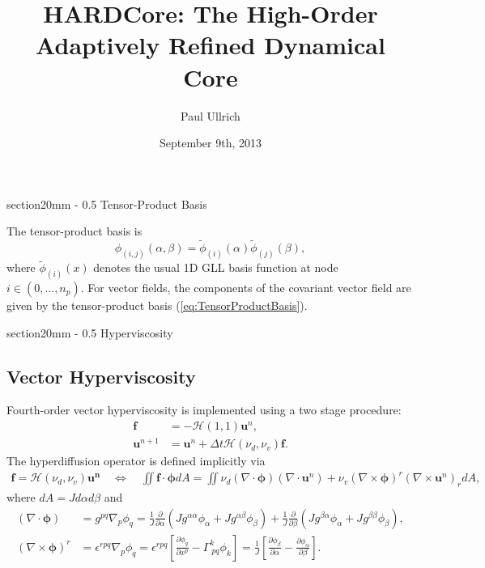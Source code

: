 \documentclass{article}
\title{\Huge \textbf{HARDCore: The High-Order Adaptively Refined Dynamical Core}}
\author{\Large Paul Ullrich}
\date{September 9th, 2013}
\makeatletter
\renewcommand\section{\@startsection
  {section}{2}{0mm}%
  {-\baselineskip}%
  {0.5\baselineskip}%
  {\normalfont\Huge\bfseries}}%
\newcommand{\vb}{\mathbf}
\newcommand{\vg}{\boldsymbol}
\newcommand{\pdiff}[2]{\frac{\partial #1}{\partial #2}}
\makeatother
\begin{document}
\section{Tensor-Product Basis}

The tensor-product basis is
\begin{equation} \label{eq:TensorProductBasis}
\phi_{(i,j)}(\alpha, \beta) = \tilde{\phi}_{(i)}(\alpha) \tilde{\phi}_{(j)}(\beta),
\end{equation} where $\tilde{\phi}_{(i)}(x)$ denotes the usual 1D GLL basis function at node $i \in (0, \ldots, n_p)$.  For vector fields, the components of the covariant vector field are given by the tensor-product basis (\ref{eq:TensorProductBasis}).

\section{Hyperviscosity}

\subsection{Vector Hyperviscosity}

Fourth-order vector hyperviscosity is implemented using a two stage procedure:
\begin{align}
\vb{f} &= - \mathcal{H}(1,1) \vb{u}^n, \\
\vb{u}^{n+1} &= \vb{u}^n + \Delta t \mathcal{H}(\nu_d, \nu_v) \vb{f}.
\end{align}  The hyperdiffusion operator is defined implicitly via
\begin{align}
\vb{f} = \mathcal{H}(\nu_d, \nu_v) \vb{u^n} \quad \Longleftrightarrow \quad \iint \vb{f} \cdot \vg{\phi} dA = \iint \nu_d (\nabla \cdot \vg{\phi}) (\nabla \cdot \vb{u}^n) + \nu_v (\nabla \times \vg{\phi})^r (\nabla \times \vb{u}^n)_r dA,
\end{align} where $dA = J d\alpha d\beta$ and
\begin{align}
(\nabla \cdot \vg{\phi}) &= g^{p q} \nabla_p \phi_q = \frac{1}{J} \pdiff{}{\alpha} \left( J g^{\alpha \alpha} \phi_\alpha + J g^{\alpha \beta} \phi_\beta \right) + \frac{1}{J} \pdiff{}{\beta} \left( J g^{\beta \alpha} \phi_\alpha + J g^{\beta \beta} \phi_\beta \right), \\
(\nabla \times \vg{\phi})^r &= \epsilon^{r p q} \nabla_p \phi_q = \epsilon^{r p q} \left[ \pdiff{\phi_q}{x^p} - \Gamma^{k}_{\ p q} \phi_k \right] = \frac{1}{J} \left[ \pdiff{\phi_\beta}{\alpha} - \pdiff{\phi_\alpha}{\beta} \right].
\end{align}
\end{document}
